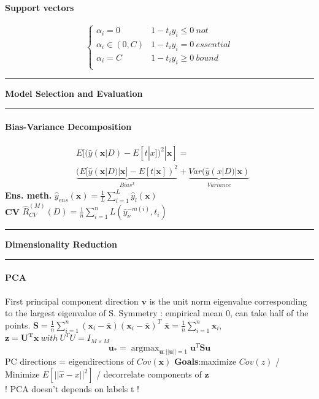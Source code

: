 \documentclass[7pt]{scrartcl}
\newlength{\secskip}
\renewcommand{\section}[1]{
  \hrule\vspace{.1em}
  \textbf{#1}
  \hrule
}
\DeclareMathOperator*{\argmax}{argmax}
\renewcommand{\vec}{\mathbf}
\begin{document}
\begin{multicols}{4}
\paragraph{Support vectors}
\begin{equation*}
\left\lbrace
\begin{array}{ll}
\alpha_i = 0 & 1-t_iy_i \leq 0 ~not \\
\alpha_i \in (0,C) & 1-t_iy_i = 0 ~essential\\
\alpha_i = C & 1-t_iy_i \geq 0 ~bound\\
\end{array}
\right.
\end{equation*}

\section{Model Selection and Evaluation}
\paragraph{Bias-Variance Decomposition}
\begin{align*}
&E[(\hat{y}(\vec{x}|D) - E[t|x])^2|\vec x] = \\
&\underbrace{(E[\hat{y}(\vec{x}|D)|\vec{x}] - E[t|\vec{x}])^2}_{Bias^2} + \underbrace{Var(\hat{y}(x|D) | \vec{x})}_{Variance}
\end{align*}
\textbf{Ens. meth.}
$\hat{y}_{ens}(\vec{x}) = \frac{1}{L} \sum_{l=1}^L \hat{y}_l(\vec{x})$\\
\textbf{CV}
$\hat{R}_{CV}^{(M)}(D) = \frac{1}{n}\sum_{i=1}^n L(\hat{y}_\nu^{-m(i)},t_i)$

\section{Dimensionality Reduction}
\paragraph{PCA}
First principal component direction $\vec v$ is the unit norm eigenvalue corresponding to the largest eigenvalue of S. Symmetry : empirical mean 0, can take half of the points.
$\vec S = \frac{1}{n} \sum_{i=1}^n (\vec{x}_i - \bar{\vec x})(\vec{x}_i - \bar{\vec x})^T$
$\bar{\vec x} = \frac{1}{n} \sum_{i=1}^n \vec x_i$,
$\vec{z = U^T x} ~with~ U^TU=I_{M \times M}$
\[\vec{u}_* = \argmax_{\vec{u}:||\vec{u}||=1} \vec{u}^T \vec S \vec{u}\]
PC directions = eigendirections of $Cov(\vec{x})$
\textbf{Goals}:maximize $Cov(z)$ / Minimize $E[||\hat{x}-x||^2]$ / decorrelate components of $\vec{z}$ \\
! PCA doesn't depends on labels t !

\end{multicols}
\end{document}
